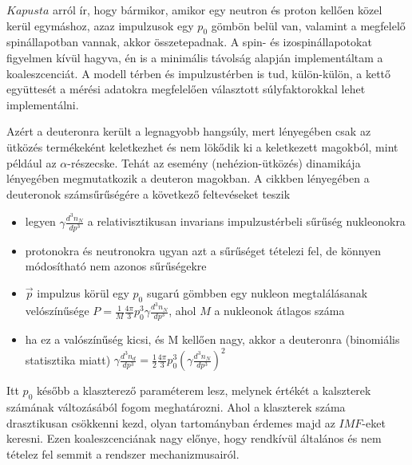 \documentclass[a4paper,12pt]{article}
\begin{document}
\par $Kapusta$ arról ír, hogy bármikor, amikor egy neutron és proton kellően közel kerül egymáshoz, azaz impulzusok egy $p_{0}$ gömbön belül van, valamint a megfelelő spinállapotban vannak, akkor összetepadnak. A spin- és izospinállapotokat figyelmen kívül hagyva, én is a minimális távolság alapján implementáltam a koaleszcenciát. A modell térben és impulzustérben is tud, külön-külön, a kettő együttesét a mérési adatokra megfelelően választott súlyfaktorokkal lehet implementálni.

\vspace{5mm}

\par Azért a deuteronra került a legnagyobb hangsúly, mert lényegében csak az ütközés termékeként keletkezhet és nem lökődik ki a keletkezett magokból, mint például az $\alpha$-részecske. Tehát az esemény (nehézion-ütközés) dinamikája lényegében megmutatkozik a deuteron magokban. A cikkben lényegében a deuteronok számsűrűségére a következő feltevéseket teszik

\vspace{5mm}

\begin{itemize}
\item legyen $\gamma \frac{d^{3}n_{N}}{dp^{3}}$ a relativisztikusan invarians impulzustérbeli sűrűség nukleonokra
\item protonokra és neutronokra ugyan azt a sűrűséget tételezi fel, de könnyen módosítható nem azonos sűrűségekre
\item $\vec{p}$ impulzus körül egy $p_{0}$ sugarú gömbben egy nukleon megtalálásanak velószínűsége $P = \frac{1}{M}\frac{4\pi}{3}p_{0}^{3}\gamma \frac{d^{3}n_{N}}{dp^{3}}$, ahol $M$ a nukleonok átlagos száma
\item ha ez a valószínűség kicsi, és M kellően nagy, akkor a deuteronra (binomiális statisztika miatt) $\gamma \frac{d^{3}n_{d}}{dp^{3}} = \frac{1}{2}\frac{4\pi}{3}p_{0}^{3}(\gamma \frac{d^{3}n_{N}}{dp^{3}})^{2}$
\end{itemize}

\vspace{5mm}

\par Itt $p_{0}$ később a klaszterező paraméterem lesz, melynek értékét a kalszterek számának változásából fogom meghatározni. Ahol a klaszterek száma drasztikusan csökkenni kezd, olyan tartományban érdemes majd az $IMF$-eket keresni. Ezen koaleszcenciának nagy előnye, hogy rendkívül általános és nem tételez fel semmit a rendszer mechanizmusairól.
\end{document}

